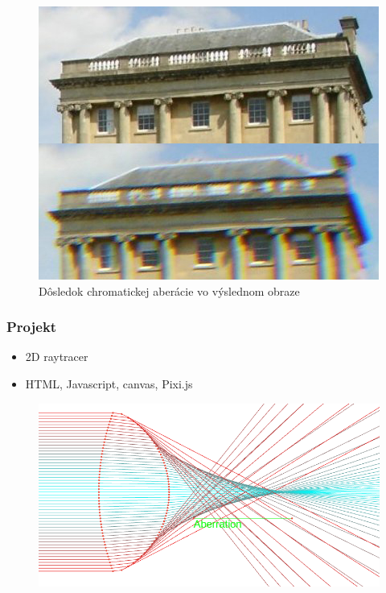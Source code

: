 \documentclass[10pt,xcolor=pdflatex]{beamer}
\begin{document}
\begin{frame}
    \begin{figure}
        \includegraphics[scale=0.4]{img/chromaticAberrationWikipedia.jpg}
        \caption{Dôsledok chromatickej aberácie vo výslednom obraze}
    \end{figure}
\end{frame}

\begin{frame}\frametitle{Projekt}
    \begin{itemize}
        \item 2D raytracer
        \item HTML, Javascript, canvas, Pixi.js
    \end{itemize}

    \begin{figure}
        \includegraphics[scale=0.35]{img/application.png}
    \end{figure}
\end{frame}
\end{document}
